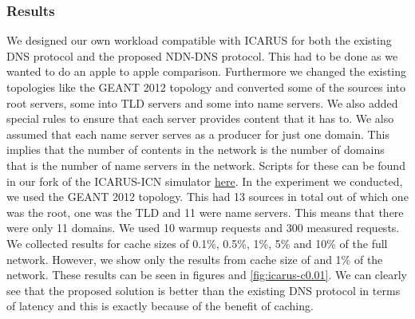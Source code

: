 \documentclass[conference]{IEEEtran}
\begin{document}
\subsubsection{Results}
We designed our own workload compatible with ICARUS for both the existing DNS protocol and the proposed NDN-DNS protocol. This had to be done as we wanted to do an apple to apple comparison. Furthermore we changed the existing topologies like the GEANT 2012 topology and converted some of the sources into root servers, some into TLD servers and some into name servers. We also added special rules to ensure that each server provides content that it has to. We also assumed that each name server serves as a producer for just one domain. This implies that the number of contents in the network is the number of domains that is the number of name servers in the network. Scripts for these can be found in our fork of the ICARUS-ICN simulator \href{https://github.com/eelfire/icarus/tree/dnsr/examples/dnsr/config4}{here}. In the experiment we conducted, we used the GEANT 2012 topology. This had 13 sources in total out of which one was the root, one was the TLD and 11 were name servers. This means that there were only 11 domains. We used 10 warmup requests and 300 measured requests. We collected results for cache sizes of 0.1\%, 0.5\%, 1\%, 5\% and 10\% of the full network. However, we show only the results from cache size of and 1\% of the network. These results can be seen in figures and \ref{fig:icarus-c0.01}. We can clearly see that the proposed solution is better than the existing DNS protocol in terms of latency and this is exactly because of the benefit of caching.
\end{document}
